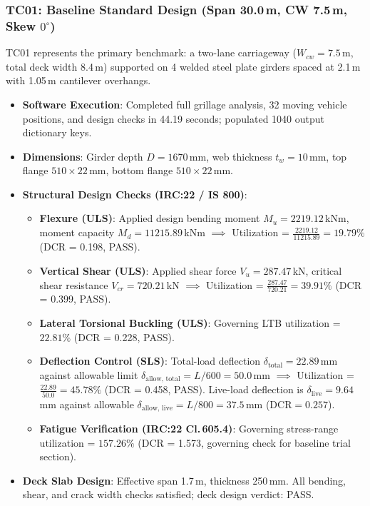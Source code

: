 \documentclass[11pt,a4paper]{article}
\begin{document}
\subsubsection{TC01: Baseline Standard Design (Span 30.0\,m, CW 7.5\,m, Skew $0^\circ$)}
TC01 represents the primary benchmark: a two-lane carriageway ($W_{cw} = 7.5$\,m, total deck width 8.4\,m) supported on 4 welded steel plate girders spaced at 2.1\,m with 1.05\,m cantilever overhangs.
\begin{itemize}
    \item \textbf{Software Execution}: Completed full grillage analysis, 32 moving vehicle positions, and design checks in 44.19 seconds; populated 1040 output dictionary keys.
    \item \textbf{Dimensions}: Girder depth $D = 1670$\,mm, web thickness $t_w = 10$\,mm, top flange $510 \times 22$\,mm, bottom flange $510 \times 22$\,mm.
    \item \textbf{Structural Design Checks (IRC:22 / IS 800)}:
    \begin{itemize}
        \item \textbf{Flexure (ULS)}: Applied design bending moment $M_u = 2219.12$\,kNm, moment capacity $M_d = 11215.89$\,kNm $\implies$ Utilization = $\frac{2219.12}{11215.89} = 19.79\%$ (DCR = 0.198, PASS).
        \item \textbf{Vertical Shear (ULS)}: Applied shear force $V_u = 287.47$\,kN, critical shear resistance $V_{cr} = 720.21$\,kN $\implies$ Utilization = $\frac{287.47}{720.21} = 39.91\%$ (DCR = 0.399, PASS).
        \item \textbf{Lateral Torsional Buckling (ULS)}: Governing LTB utilization = $22.81\%$ (DCR = 0.228, PASS).
        \item \textbf{Deflection Control (SLS)}: Total-load deflection $\delta_{\text{total}} = 22.89$\,mm against allowable limit $\delta_{\text{allow, total}} = L/600 = 50.0$\,mm $\implies$ Utilization = $\frac{22.89}{50.0} = 45.78\%$ (DCR = 0.458, PASS). Live-load deflection is $\delta_{\text{live}} = 9.64$\,mm against allowable $\delta_{\text{allow, live}} = L/800 = 37.5$\,mm ($\text{DCR} = 0.257$).
        \item \textbf{Fatigue Verification (IRC:22 Cl.\,605.4)}: Governing stress-range utilization = $157.26\%$ (DCR = 1.573, governing check for baseline trial section).
    \end{itemize}
    \item \textbf{Deck Slab Design}: Effective span 1.7\,m, thickness 250\,mm. All bending, shear, and crack width checks satisfied; deck design verdict: PASS.
\end{itemize}
\end{document}
